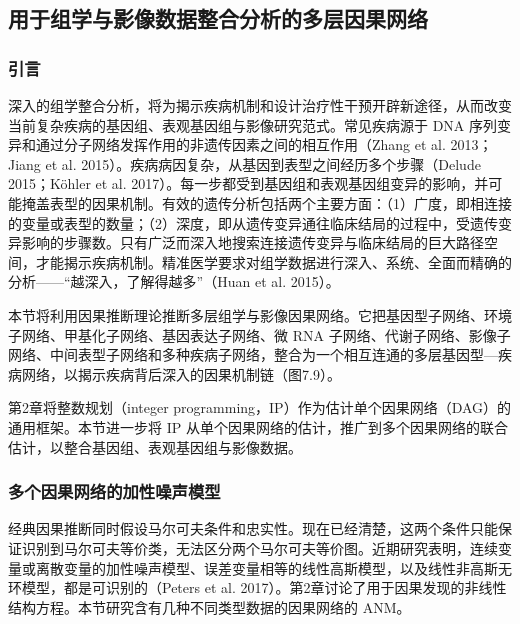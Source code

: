 \subsection{用于组学与影像数据整合分析的多层因果网络}
\subsubsection{引言}

深入的组学整合分析，将为揭示疾病机制和设计治疗性干预开辟新途径，从而改变当前复杂疾病的基因组、表观基因组与影像研究范式。常见疾病源于 DNA 序列变异和通过分子网络发挥作用的非遗传因素之间的相互作用（Zhang et al. 2013；Jiang et al. 2015）。疾病病因复杂，从基因到表型之间经历多个步骤（Delude 2015；Köhler et al. 2017）。每一步都受到基因组和表观基因组变异的影响，并可能掩盖表型的因果机制。有效的遗传分析包括两个主要方面：（1）广度，即相连接的变量或表型的数量；（2）深度，即从遗传变异通往临床结局的过程中，受遗传变异影响的步骤数。只有广泛而深入地搜索连接遗传变异与临床结局的巨大路径空间，才能揭示疾病机制。精准医学要求对组学数据进行深入、系统、全面而精确的分析——“越深入，了解得越多”（Huan et al. 2015）。

本节将利用因果推断理论推断多层组学与影像因果网络。它把基因型子网络、环境子网络、甲基化子网络、基因表达子网络、微 RNA 子网络、代谢子网络、影像子网络、中间表型子网络和多种疾病子网络，整合为一个相互连通的多层基因型—疾病网络，以揭示疾病背后深入的因果机制链（图7.9）。

第2章将整数规划（integer programming，IP）作为估计单个因果网络（DAG）的通用框架。本节进一步将 IP 从单个因果网络的估计，推广到多个因果网络的联合估计，以整合基因组、表观基因组与影像数据。


\subsubsection{多个因果网络的加性噪声模型}

经典因果推断同时假设马尔可夫条件和忠实性。现在已经清楚，这两个条件只能保证识别到马尔可夫等价类，无法区分两个马尔可夫等价图。近期研究表明，连续变量或离散变量的加性噪声模型、误差变量相等的线性高斯模型，以及线性非高斯无环模型，都是可识别的（Peters et al. 2017）。第2章讨论了用于因果发现的非线性结构方程。本节研究含有几种不同类型数据的因果网络的 ANM。


